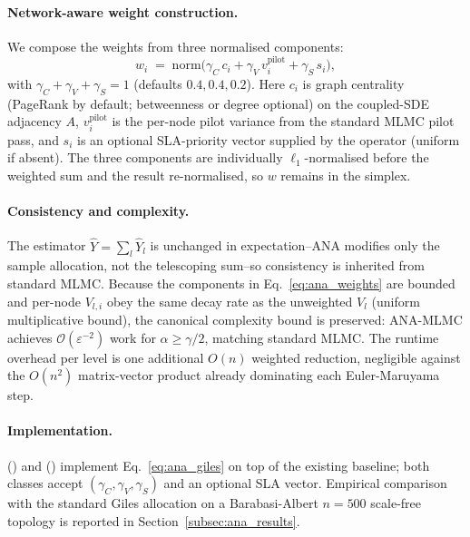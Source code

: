 \documentclass[pdflatex,sn-mathphys-num]{sn-jnl}
\theoremstyle{thmstyleone}%
\theoremstyle{thmstyletwo}%
\theoremstyle{thmstylethree}%
\begin{document}
\paragraph{Network-aware weight construction.}
We compose the weights from three normalised components:
\begin{equation}
    w_i \;=\; \mathrm{norm}\bigl(\gamma_C\, c_i
                + \gamma_V\, v_i^{\text{pilot}}
                + \gamma_S\, s_i\bigr),
    \label{eq:ana_weights}
\end{equation}
with $\gamma_C+\gamma_V+\gamma_S=1$ (defaults $0.4, 0.4, 0.2$). Here $c_i$ is graph centrality
(PageRank by default; betweenness or degree optional) on the coupled-SDE adjacency $A$,
$v_i^{\text{pilot}}$ is the per-node pilot variance from the standard MLMC pilot pass, and $s_i$
is an optional SLA-priority vector supplied by the operator (uniform if absent). The three
components are individually $\ell_1$-normalised before the weighted sum and the result
re-normalised, so $w$ remains in the simplex.

\paragraph{Consistency and complexity.}
The estimator $\hat Y = \sum_l \hat Y_l$ is unchanged in expectation--ANA modifies only the
sample allocation, not the telescoping sum--so consistency is inherited from standard MLMC.
Because the components in Eq.~\eqref{eq:ana_weights} are bounded and per-node $V_{l,i}$ obey the
same decay rate as the unweighted $V_l$ (uniform multiplicative bound), the canonical complexity
bound is preserved: ANA-MLMC achieves $\mathcal{O}(\varepsilon^{-2})$ work for
$\alpha \ge \gamma/2$, matching standard MLMC. The runtime overhead per level is one additional
$O(n)$ weighted reduction, negligible against the $O(n^2)$ matrix-vector product already
dominating each Euler-Maruyama step.

\paragraph{Implementation.}
\begin{sloppypar}
 () and
 () implement
Eq.~\eqref{eq:ana_giles} on top of the existing baseline; both classes accept
$(\gamma_C,\gamma_V,\gamma_S)$ and an optional SLA vector. Empirical comparison with the
standard Giles allocation on a Barabasi-Albert $n=500$ scale-free topology is reported in
Section~\ref{subsec:ana_results}.
\end{sloppypar}
\end{document}
